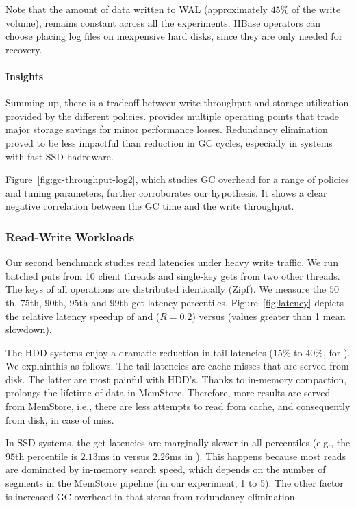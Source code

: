 Note that the amount of data written to WAL %
(approximately $45$\% of the write volume), remains constant across all the experiments. 
HBase operators can choose placing log files on inexpensive hard disks, since they are only needed for recovery.  

\paragraph{Insights} Summing up, there is a tradeoff between write throughput and storage utilization 
provided by the different \sys\/ policies. \adp\/ provides multiple operating points that trade major 
storage savings for minor performance losses. Redundancy elimination proved to be less impactful 
than reduction in GC cycles, especially in systems with fast SSD hadrdware. 

Figure~\ref{fig:gc-throughput-log2}, which studies GC overhead for a range of policies and tuning 
parameters, further corroborates our hypothesis. It shows a clear negative correlation between the 
GC time and the write throughput. 

\subsubsection{Read-Write Workloads}

Our second benchmark studies read latencies under heavy write traffic. 
We run batched puts from 10 client threads and single-key gets from two other threads. 
The keys of all operations are distributed identically (Zipf). We measure the $50$th, 
$75$th, $90$th, $95$th and $99$th get latency percentiles. Figure~\ref{fig:latency} 
depicts the relative latency speedup of \basic\/ and \adp\/ ($R=0.2$) versus \none\/ 
(values greater than 1 mean slowdown). 

The HDD systems enjoy a dramatic reduction in tail latencies ($15$\% to $40$\%, for \adp). 
We explainthis as follows. The tail latencies are cache misses that are served from disk. 
The latter are most painful with HDD's. Thanks to in-memory compaction, \adp\/ prolongs 
the lifetime of data in MemStore. Therefore, more results are served from MemStore, i.e., 
there are less attempts to read from cache, and consequently from disk, in case of miss.  

In SSD systems, the get latencies are marginally slower in all percentiles (e.g., the 
$95$th percentile is $2.13$ms in \none\/ versus $2.26$ms in \adp). This happens
because most reads are dominated by in-memory search speed, which depends on the 
number of segments in the MemStore pipeline (in our experiment, 1 to 5). The other factor
is increased GC overhead in \adp\/ that stems from redundancy elimination. 

